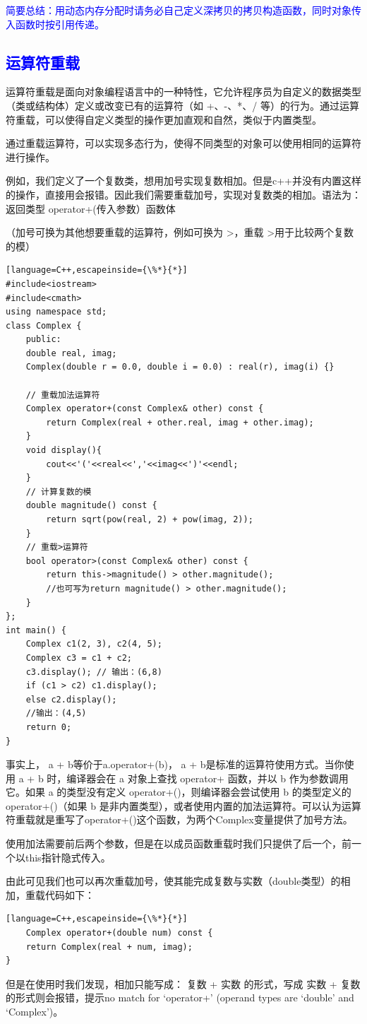 \documentclass[UTF8]{ctexart}
\begin{document}
\textcolor{blue}{简要总结：用动态内存分配时请务必自己定义深拷贝的拷贝构造函数，同时对象传入函数时按引用传递。}
\subsection{\textcolor{blue}{运算符重载}}
运算符重载是面向对象编程语言中的一种特性，它允许程序员为自定义的数据类型（类或结构体）定义或改变已有的运算符（如 +、-、*、/ 等）的行为。通过运算符重载，可以使得自定义类型的操作更加直观和自然，类似于内置类型。

通过重载运算符，可以实现多态行为，使得不同类型的对象可以使用相同的运算符进行操作。

例如，我们定义了一个复数类，想用加号实现复数相加。但是c++并没有内置这样的操作，直接用会报错。因此我们需要重载加号，实现对复数类的相加。语法为：
返回类型  operator+(传入参数）{函数体}

（加号可换为其他想要重载的运算符，例如可换为 >，重载 >用于比较两个复数的模）
\begin{lstlisting}[language=C++,escapeinside={\%*}{*}]
#include<iostream>
#include<cmath>
using namespace std;
class Complex {
	public:
	double real, imag;
	Complex(double r = 0.0, double i = 0.0) : real(r), imag(i) {}
	
	// 重载加法运算符
	Complex operator+(const Complex& other) const {
		return Complex(real + other.real, imag + other.imag);
	}  
	void display(){
		cout<<'('<<real<<','<<imag<<')'<<endl;
	}
	// 计算复数的模
	double magnitude() const {
		return sqrt(pow(real, 2) + pow(imag, 2));
	}
	// 重载>运算符
	bool operator>(const Complex& other) const {
		return this->magnitude() > other.magnitude();
		//也可写为return magnitude() > other.magnitude();
	}
};
int main() {
	Complex c1(2, 3), c2(4, 5);
	Complex c3 = c1 + c2;
	c3.display(); // 输出：(6,8)
	if (c1 > c2) c1.display();
	else c2.display();
	//输出：(4,5)
	return 0;
}
\end{lstlisting}
事实上， a + b等价于a.operator+(b)， a + b是标准的运算符使用方式。当你使用 a + b 时，编译器会在 a 对象上查找 operator+ 函数，并以 b 作为参数调用它。如果 a 的类型没有定义 operator+()，则编译器会尝试使用 b 的类型定义的 operator+()（如果 b 是非内置类型），或者使用内置的加法运算符。可以认为运算符重载就是重写了operator+()这个函数，为两个Complex变量提供了加号方法。

使用加法需要前后两个参数，但是在以成员函数重载时我们只提供了后一个，前一个以this指针隐式传入。

由此可见我们也可以再次重载加号，使其能完成复数与实数（double类型）的相加，重载代码如下：
\begin{lstlisting}[language=C++,escapeinside={\%*}{*}]
    Complex operator+(double num) const {
	return Complex(real + num, imag);
}
\end{lstlisting}
但是在使用时我们发现，相加只能写成： 复数 + 实数
的形式，写成  实数 + 复数 的形式则会报错，提示no match for ‘operator+’ (operand types are ‘double’ and ‘Complex’)。
\end{document}
